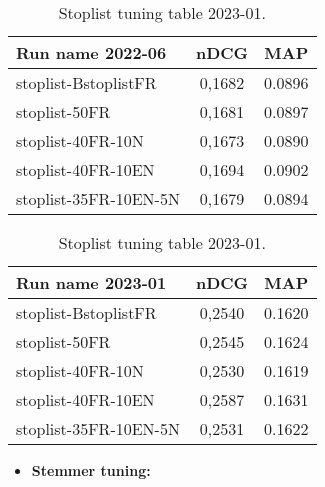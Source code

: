 \begin{table}[ht]
    \centering
    \begin{minipage}{0.48\textwidth}
        \centering
        \begin{tabular}{ |l|c|c| }
            \hline
            Run name 2022-06 & nDCG & MAP \\
            \hline\hline
            stoplist-BstoplistFR & 0,1682 & 0.0896 \\
            stoplist-50FR & 0,1681 & 0.0897 \\
            stoplist-40FR-10N & 0,1673 & 0.0890 \\
            \rowcolor{LightYellow}
            stoplist-40FR-10EN & 0,1694 & 0.0902 \\
            stoplist-35FR-10EN-5N & 0,1679 & 0.0894 \\
            \hline
        \end{tabular}
        \caption{Stoplist tuning table 2022-06.}
        \label{tab:stoplist-2022}
    \end{minipage}
    \hfill
    \begin{minipage}{0.48\textwidth}
        \centering
        \begin{tabular}{ |l|c|c| }
            \hline
            Run name 2023-01 & nDCG & MAP \\
            \hline\hline
            stoplist-BstoplistFR & 0,2540 & 0.1620 \\
            stoplist-50FR & 0,2545 & 0.1624 \\
            stoplist-40FR-10N & 0,2530 & 0.1619 \\
            \rowcolor{LightYellow}
            stoplist-40FR-10EN & 0,2587 & 0.1631 \\
            stoplist-35FR-10EN-5N & 0,2531 & 0.1622 \\
            \hline
        \end{tabular}
        \caption{Stoplist tuning table 2023-01.}
        \label{tab:stoplist-2023}
    \end{minipage}
\end{table}

\begin{itemize}
    \item  \textbf{Stemmer tuning:}
\end{itemize}

